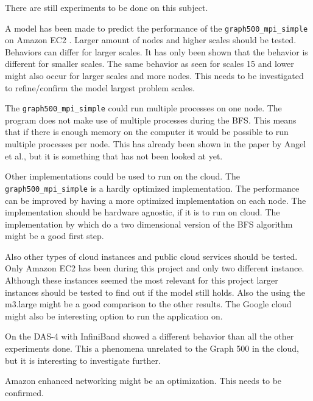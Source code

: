 There are still experiments to be done on this subject.

A model has been made to predict the performance of the  \texttt{graph500\_mpi\_simple} on Amazon EC2 . Larger amount of nodes and higher scales should be tested. Behaviors can differ for larger scales. It has only been shown that the behavior is different for smaller scales. The same behavior as seen for scales 15 and lower might also occur for larger scales and more nodes. This needs to be investigated to refine/confirm the model largest problem scales.  

The \texttt{graph500\_mpi\_simple} could run multiple processes on one node. The program does not make use of multiple processes during the BFS. This means that if there is enough memory on the computer it would be possible to run multiple processes per node. This has already been shown in the paper by Angel et al.\cite{angel2012graph}, but it is something that has not been looked at yet.

Other implementations could be used to run on the cloud. The \texttt{graph500\_mpi\_simple} is a hardly optimized implementation. The performance can be improved by having a more optimized implementation on each node. The implementation should be hardware agnostic, if it is to run on cloud. The implementation by \cite{ueno2012highly} which do a two dimensional version of the BFS algorithm might be a good first step.
 
Also other types of cloud instances and public cloud services should be tested. Only Amazon EC2 has been during this project and only two different instance. Although these instances seemed the most relevant for this project larger instances should be tested to find out if the model still holds. Also the using the m3.large might be a good comparison to the other results. The Google cloud might also be interesting option to run the application on.

On the DAS-4 with InfiniBand showed a different behavior than all the other experiments done. This a phenomena unrelated to the Graph 500 in the cloud, but it is interesting to investigate further.

Amazon enhanced networking might be an optimization. This needs to be confirmed.